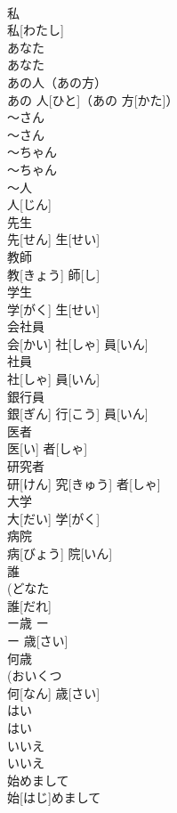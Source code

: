 \documentclass[8pt]{extreport}
\begin{document}
\begin{CJK}{UTF8}{min}
\\	私	
\\	私[わたし]		
\\	あなた	
\\	あなた		
\\	あの人（あの方）	
\\	あの 人[ひと]（あの 方[かた]）		
\\	～さん	
\\	～さん		
\\	～ちゃん	
\\	～ちゃん		
\\	～人	
\\	人[じん]		
\\	先生	
\\	先[せん] 生[せい]		
\\	教師	
\\	教[きょう] 師[し]		
\\	学生	
\\	学[がく] 生[せい]		
\\	会社員	
\\	会[かい] 社[しゃ] 員[いん]		
\\	社員	
\\	社[しゃ] 員[いん]		
\\	銀行員	
\\	銀[ぎん] 行[こう] 員[いん]		
\\	医者	
\\	医[い] 者[しゃ]		
\\	研究者	
\\	研[けん] 究[きゅう] 者[しゃ]		
\\	大学	
\\	大[だい] 学[がく]		
\\	病院	
\\	病[びょう] 院[いん]		
\\	誰	
\\	(どなた 
\\	誰[だれ]		
\\	ー歳	ー 
\\	ー 歳[さい]		
\\	何歳	
\\	(おいくつ 
\\	何[なん] 歳[さい]		
\\	はい	
\\	はい		
\\	いいえ	
\\	いいえ		
\\	始めまして	
\\	始[はじ]めまして		

\end{CJK}
\end{document}
